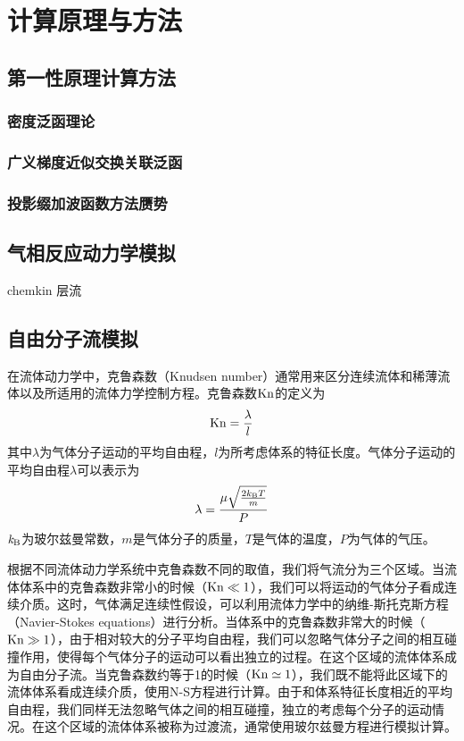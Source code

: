 \chapter{计算原理与方法}
\section{第一性原理计算方法}
\subsection{密度泛函理论}
\subsection{广义梯度近似交换关联泛函}
\subsection{投影缀加波函数方法赝势}

\section{气相反应动力学模拟}
chemkin
层流
\section{自由分子流模拟}
    在流体动力学中，克鲁森数（Knudsen number）通常用来区分连续流体和稀薄流体以及所适用的流体力学控制方程。克鲁森数$\rm Kn$的定义为\chinesecolon
    \begin{equation}
        {\rm Kn}=\frac{\lambda}{l}
    \end{equation}
    其中$\lambda$为气体分子运动的平均自由程\chinesecolon，$l$为所考虑体系的特征长度。气体分子运动的平均自由程$\lambda$可以表示为\chinesecolon
    \begin{equation}
        \lambda=\frac{\mu \sqrt{\frac{2k_{\rm B}T}{m}}}{P}
    \end{equation}
    $\it k_{\rm B} \it$为玻尔兹曼常数，$m$是气体分子的质量，$T$是气体的温度，$P$为气体的气压。

    根据不同流体动力学系统中克鲁森数不同的取值，我们将气流分为三个区域。当流体体系中的克鲁森数非常小的时候（${\rm Kn}\ll 1$），我们可以将运动的气体分子看成连续介质。这时，气体满足连续性假设，可以利用流体力学中的纳维-斯托克斯方程（Navier-Stokes equations）进行分析。当体系中的克鲁森数非常大的时候（${\rm Kn}\gg 1$），由于相对较大的分子平均自由程，我们可以忽略气体分子之间的相互碰撞作用，使得每个气体分子的运动可以看出独立的过程。在这个区域的流体体系成为自由分子流。当克鲁森数约等于1的时候（${\rm Kn}\simeq 1$），我们既不能将此区域下的流体体系看成连续介质，使用N-S方程进行计算。由于和体系特征长度相近的平均自由程，我们同样无法忽略气体之间的相互碰撞，独立的考虑每个分子的运动情况。在这个区域的流体体系被称为过渡流，通常使用玻尔兹曼方程进行模拟计算。


